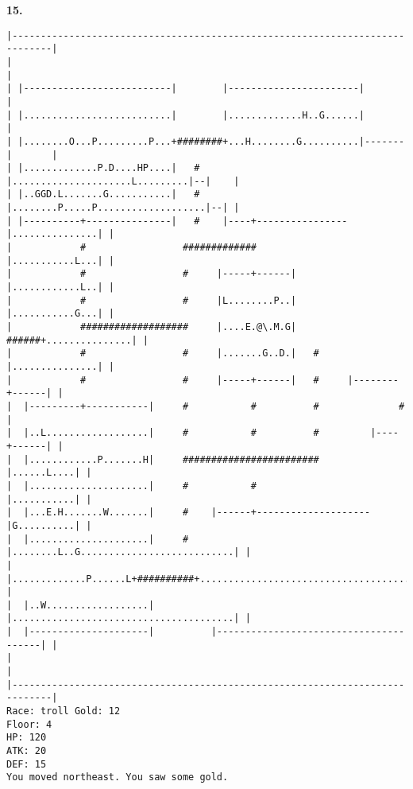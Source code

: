 \documentclass[11pt]{article}
\theoremstyle{plain}
\begin{document}
\newpage
\textbf{15. }
\begin{Verbatim}[fontsize=\scriptsize]
|-----------------------------------------------------------------------------|
|                                                                             |
| |--------------------------|        |-----------------------|               |
| |..........................|        |.............H..G......|               |
| |........O...P.........P...+########+...H........G..........|-------|       |
| |.............P.D....HP....|   #    |.....................L.........|--|    |
| |..GGD.L.......G...........|   #    |........P.....P...................|--| |
| |----------+---------------|   #    |----+----------------|...............| |
|            #                 #############                |...........L...| |
|            #                 #     |-----+------|         |............L..| |
|            #                 #     |L........P..|         |...........G...| |
|            ###################     |....E.@\.M.G|   ######+...............| |
|            #                 #     |.......G..D.|   #     |...............| |
|            #                 #     |-----+------|   #     |--------+------| |
|  |---------+-----------|     #           #          #              #        |
|  |..L..................|     #           #          #         |----+------| |
|  |............P.......H|     ########################         |......L....| |
|  |.....................|     #           #                    |...........| |
|  |...E.H.......W.......|     #    |------+--------------------|G..........| |
|  |.....................|     #    |........L..G...........................| |
|  |.............P......L+##########+.......................................| |
|  |..W..................|          |.......................................| |
|  |---------------------|          |---------------------------------------| |
|                                                                             |
|-----------------------------------------------------------------------------|
Race: troll Gold: 12                                                   Floor: 4
HP: 120
ATK: 20
DEF: 15
You moved northeast. You saw some gold. 
\end{Verbatim}
\end{document}
